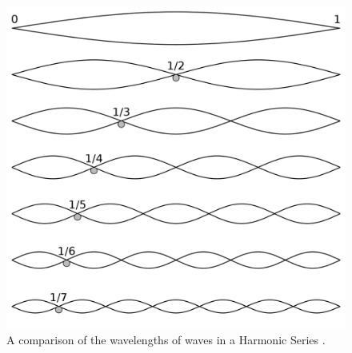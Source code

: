 \begin{figure}[h!]
  \centering
  \includegraphics[width=0.5\linewidth]{image/Harmonics.png}
  \caption{A comparison of the wavelengths of waves in a Harmonic Series \autocite{harmonicSeries}.}
\end{figure}

